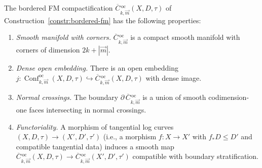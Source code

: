 \begin{theorem}
\label{thm:bordered-fm-properties}
The bordered FM compactification
$\overline{C}{}^{\,\mathrm{oc}}_{k,\vec{m}}(X, D, \tau)$ of
Construction~\textup{\ref{constr:bordered-fm}} has the following
properties:
\begin{enumerate}[label=\textup{(\roman*)}]
\item \emph{Smooth manifold with corners.}
 $\overline{C}{}^{\,\mathrm{oc}}_{k,\vec{m}}$ is a compact smooth
 manifold with corners of dimension $2k + |\vec{m}|$.
\item \emph{Dense open embedding.}
 There is an open embedding
 $j \colon \operatorname{Conf}^{\mathrm{oc}}_{k,\vec{m}}(X, D, \tau)
 \hookrightarrow
 \overline{C}{}^{\,\mathrm{oc}}_{k,\vec{m}}(X, D, \tau)$
 with dense image.
\item \emph{Normal crossings.}
 The boundary $\partial\,\overline{C}{}^{\,\mathrm{oc}}_{k,\vec{m}}$
 is a union of smooth codimension-one faces intersecting in
 normal crossings.
\item \emph{Functoriality.}
 A morphism of tangential log curves $(X, D, \tau) \to
 (X', D', \tau')$ (i.e., a morphism $f \colon X \to X'$ with
 $f_* D \leq D'$ and compatible tangential data) induces a
 smooth map
 $\overline{C}{}^{\,\mathrm{oc}}_{k,\vec{m}}(X, D, \tau) \to
 \overline{C}{}^{\,\mathrm{oc}}_{k,\vec{m}}(X', D', \tau')$
 compatible with boundary stratification.
\end{enumerate}
\end{theorem}

